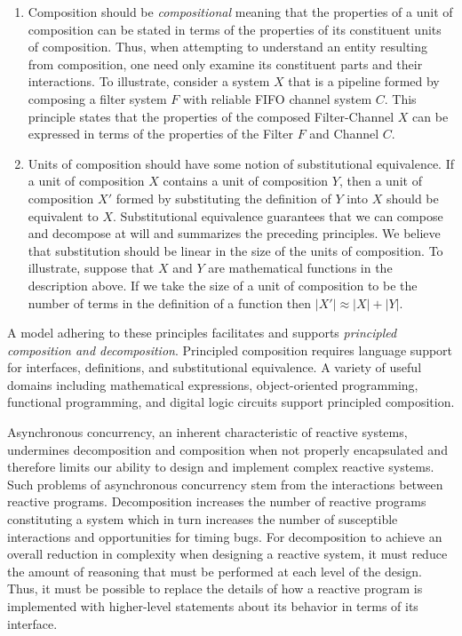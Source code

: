 \begin{enumerate}
\item Composition should be \emph{compositional} meaning that the properties of a unit of composition can be stated in terms of the properties of its constituent units of composition.
Thus, when attempting to understand an entity resulting from composition, one need only examine its constituent parts and their interactions.
To illustrate, consider a system $X$ that is a pipeline formed by composing a filter system $F$ with reliable FIFO channel system $C$.
This principle states that the properties of the composed Filter-Channel $X$ can be expressed in terms of the properties of the Filter $F$ and Channel $C$.

\item Units of composition should have some notion of substitutional equivalence.
If a unit of composition $X$ contains a unit of composition $Y$, then a unit of composition $X'$ formed by substituting the definition of $Y$ into $X$ should be equivalent to $X$.
Substitutional equivalence guarantees that we can compose and decompose at will and summarizes the preceding principles.
We believe that substitution should be linear in the size of the units of composition.
To illustrate, suppose that $X$ and $Y$ are mathematical functions in the description above. %
If we take the size of a unit of composition to be the number of terms in the definition of a function then $|X'| \approx |X| + |Y|$.
\end{enumerate}
A model adhering to these principles facilitates and supports \emph{principled composition and decomposition}.
Principled composition requires language support for interfaces, definitions, and substitutional equivalence.
A variety of useful domains including mathematical expressions, object-oriented programming, functional programming, and digital logic circuits support principled composition.

Asynchronous concurrency, an inherent characteristic of reactive systems, undermines decomposition and composition when not properly encapsulated and therefore limits our ability to design and implement complex reactive systems.
Such problems of asynchronous concurrency stem from the interactions between reactive programs.
Decomposition increases the number of reactive programs constituting a system which in turn increases the number of susceptible interactions and opportunities for timing bugs.
For decomposition to achieve an overall reduction in complexity when designing a reactive system, it must reduce the amount of reasoning that must be performed at each level of the design.
Thus, it must be possible to replace the details of how a reactive program is implemented with higher-level statements about its behavior in terms of its interface.

